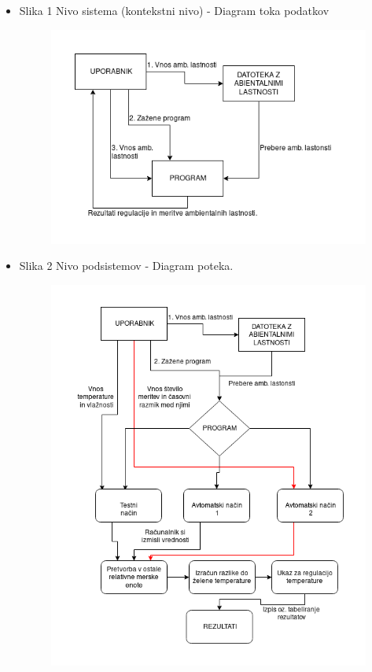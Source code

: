 \documentclass[a4paper,12pt]{article}
\begin{document}
				\begin{itemize}
					\item Slika 1 Nivo sistema (kontekstni nivo) - Diagram toka podatkov
						
						\begin{figure}[h]
							\centering
							\includegraphics[width=15cm]{diagrami_slike/nivo_sistema.png}
						\end{figure}

					\newpage

					\item Slika 2 Nivo podsistemov - Diagram poteka.	

						\begin{figure}[h]
							\centering
							\includegraphics[width=13cm]{diagrami_slike/nivo_podsistemov.png}
						\end{figure}

				\end{itemize}
			
\end{document}
